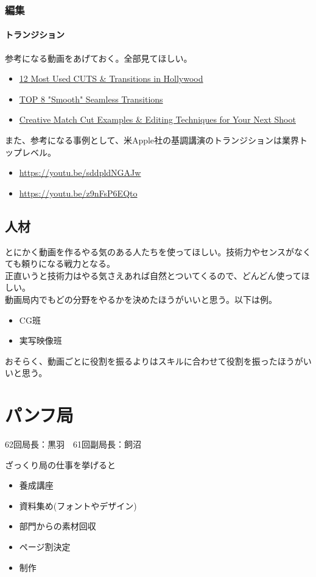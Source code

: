 \documentclass[dvipdfmx,jb5]{jreport}
\newcommand{\link}[2]{\href{#2}{#1}}
\newcommand{\Chapter}[1]{\chapter{#1}\thispagestyle{fancy}}
\begin{document}
\subsection{編集}
\subsubsection{トランジション}
参考になる動画をあげておく。全部見てほしい。
\begin{itemize}
      \item \link{12 Most Used CUTS \& Transitions in Hollywood}{https://youtu.be/VVTZNg-IgGI}
      \item \link{TOP 8 "Smooth" Seamless Transitions}{https://youtu.be/t5k7feqZUD0}
      \item \link{Creative Match Cut Examples \& Editing Techniques for Your Next Shoot}{https://youtu.be/ptXlYulVAsM}
\end{itemize}
また、参考になる事例として、米Apple社の基調講演のトランジションは業界トップレベル。
\begin{itemize}
      \item \url{https://youtu.be/sddpldNGAJw}
      \item \url{https://youtu.be/z9nFsP6EQto}
\end{itemize}
\section{人材}
とにかく動画を作るやる気のある人たちを使ってほしい。技術力やセンスがなくても頼りになる戦力となる。\\
正直いうと技術力はやる気さえあれば自然とついてくるので、どんどん使ってほしい。\\
動画局内でもどの分野をやるかを決めたほうがいいと思う。以下は例。
\begin{itemize}
      \item CG班
      \item 実写映像班
\end{itemize}
おそらく、動画ごとに役割を振るよりはスキルに合わせて役割を振ったほうがいいと思う。

\Chapter{パンフ局}
62回局長：黒羽　61回副局長：飼沼

ざっくり局の仕事を挙げると
\begin{itemize}
      \item 養成講座
      \item 資料集め(フォントやデザイン)
      \item 部門からの素材回収
      \item ページ割決定
      \item 制作
\end{itemize}
\end{document}
